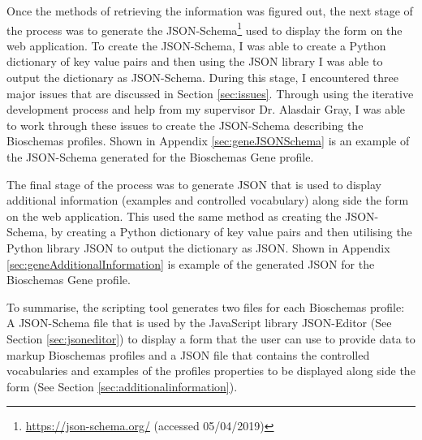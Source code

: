 Once the methods of retrieving the information was figured out, the next stage of the process was to generate the JSON-Schema\footnote{\url{https://json-schema.org/} (accessed 05/04/2019)} used to display the form on the web application. To create the JSON-Schema, I was able to create a Python dictionary of key value pairs and then using the JSON library I was able to output the dictionary as JSON-Schema. During this stage, I encountered three major issues that are discussed in Section \ref{sec:issues}. Through using the iterative development process and help from my supervisor Dr. Alasdair Gray, I was able to work through these issues to create the JSON-Schema describing the Bioschemas profiles. Shown in Appendix \ref{sec:geneJSONSchema} is an example of the JSON-Schema generated for the Bioschemas Gene profile.

The final stage of the process was to generate JSON that is used to display additional information (examples and controlled vocabulary) along side the form on the web application. This used the same method as creating the JSON-Schema, by creating a Python dictionary of key value pairs and then utilising the Python library JSON to output the dictionary as JSON. Shown in Appendix \ref{sec:geneAdditionalInformation} is example of the generated JSON for the Bioschemas Gene profile.

To summarise, the scripting tool generates two files for each Bioschemas profile: A JSON-Schema file that is used by the JavaScript library JSON-Editor (See Section \ref{sec:jsoneditor}) to display a form that the user can use to provide data to markup Bioschemas profiles and a JSON file that contains the controlled vocabularies and examples of the profiles properties to be displayed along side the form (See Section \ref{sec:additionalinformation}).


